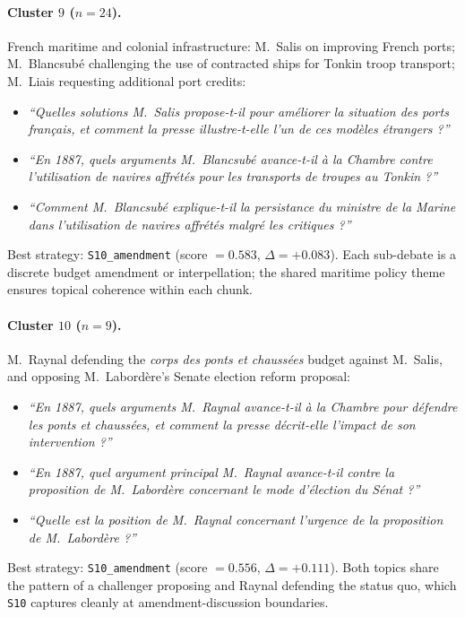 \paragraph{Cluster $9$ ($n=24$).}
French maritime and colonial infrastructure: M.~Salis on improving French ports;
M.~Blancsubé challenging the use of contracted ships for Tonkin troop transport;
M.~Liais requesting additional port credits:
\begin{itemize}
  \item \textit{``Quelles solutions M.~Salis propose-t-il pour am\'{e}liorer la
    situation des ports fran\c{c}ais, et comment la presse illustre-t-elle l'un
    de ces mod\`{e}les \'{e}trangers ?''}
  \item \textit{``En 1887, quels arguments M.~Blancsubé avance-t-il \`{a} la
    Chambre contre l'utilisation de navires affr\'{e}t\'{e}s pour les transports
    de troupes au Tonkin ?''}
  \item \textit{``Comment M.~Blancsubé explique-t-il la persistance du ministre de
    la Marine dans l'utilisation de navires affr\'{e}t\'{e}s malgr\'{e} les
    critiques ?''}
\end{itemize}
Best strategy: \texttt{S10\_amendment} (score $= 0.583$, $\Delta = +0.083$).
Each sub-debate is a discrete budget amendment or interpellation; the shared
maritime policy theme ensures topical coherence within each chunk.

\paragraph{Cluster $10$ ($n=9$).}
M.~Raynal defending the \emph{corps des ponts et chauss\'{e}es} budget against
M.~Salis, and opposing M.~Labord\`{e}re's Senate election reform proposal:
\begin{itemize}
  \item \textit{``En 1887, quels arguments M.~Raynal avance-t-il \`{a} la Chambre
    pour d\'{e}fendre les ponts et chauss\'{e}es, et comment la presse
    d\'{e}crit-elle l'impact de son intervention ?''}
  \item \textit{``En 1887, quel argument principal M.~Raynal avance-t-il contre la
    proposition de M.~Labord\`{e}re concernant le mode d'\'{e}lection du
    S\'{e}nat ?''}
  \item \textit{``Quelle est la position de M.~Raynal concernant l'urgence de la
    proposition de M.~Labord\`{e}re ?''}
\end{itemize}
Best strategy: \texttt{S10\_amendment} (score $= 0.556$, $\Delta = +0.111$).
Both topics share the pattern of a challenger proposing and Raynal defending the
status quo, which \texttt{S10} captures cleanly at amendment-discussion
boundaries.


